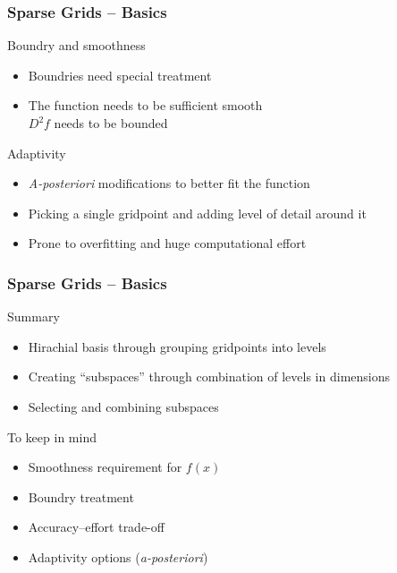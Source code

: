 \begin{frame}
  \frametitle{Sparse Grids -- Basics}
  \topline
  \vspace{-10px}
  \begin{block}{Boundry and smoothness}
    \begin{itemize}
      \item Boundries need special treatment
      \item The function needs to be sufficient smooth \\
        $D^2f$ needs to be bounded
      \end{itemize}
  \end{block}
  \begin{block}{Adaptivity}
    \begin{itemize}
      \item \emph{A-posteriori} modifications to better fit the function
      \item Picking a single gridpoint and adding level of detail around it
      \item Prone to overfitting and huge computational effort
      \end{itemize}
  \end{block}
\end{frame}


\begin{frame}
  \frametitle{Sparse Grids -- Basics}
  \topline
  \vspace{-10px}
  \begin{block}{Summary}
    \begin{itemize}
      \item Hirachial basis through grouping gridpoints into levels
      \item Creating ``subspaces'' through combination of levels in dimensions
      \item Selecting and combining subspaces
      \end{itemize}
  \end{block}
  \begin{block}{To keep in mind}
    \begin{itemize}
      \item Smoothness requirement for $f(x)$
      \item Boundry treatment
      \item Accuracy--effort trade-off
      \item Adaptivity options (\emph{a-posteriori})
      \end{itemize}
  \end{block}
\end{frame}



